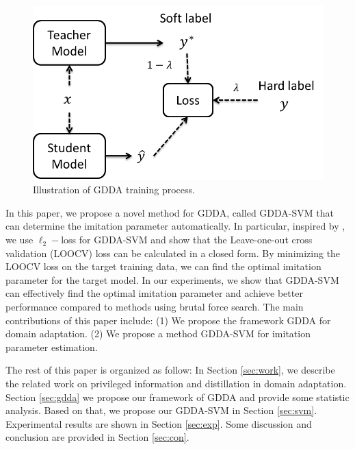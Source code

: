 \begin{figure}
\centering
\includegraphics[scale=.8]{figure/GDDA.png}
\caption{Illustration of GDDA training process.}
\end{figure}
In this paper, we propose a novel method for GDDA, called GDDA-SVM that can determine the imitation parameter automatically. In particular, inspired by \cite{cawley2006leave}, we use $\ell_2-$loss for GDDA-SVM and show that the Leave-one-out cross validation (LOOCV) loss can be calculated in a closed form. By minimizing the LOOCV loss on the target training data, we can find the optimal imitation parameter for the target model. In our experiments, we show that GDDA-SVM can effectively find the optimal imitation parameter and achieve better performance compared to methods using brutal force search. The main contributions of this paper include: (1) We propose the framework GDDA for domain adaptation. (2) We propose a method GDDA-SVM for imitation parameter estimation.

The rest of this paper is organized as follow: In Section \ref{sec:work}, we describe the related work on privileged information and distillation in domain adaptation. Section \ref{sec:gdda} we propose our framework of GDDA and provide some statistic analysis. Based on that, we propose our GDDA-SVM in Section \ref{sec:svm}. Experimental results are shown in Section \ref{sec:exp}. Some discussion and conclusion are provided in Section \ref{sec:con}.

